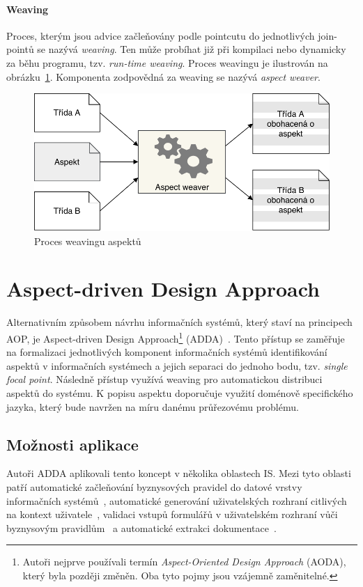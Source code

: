 \paragraph{Weaving}
Proces, kterým jsou advice začleňovány podle pointcutu do
jednotlivých join-pointů se nazývá \textit{weaving}. Ten může
probíhat již při kompilaci nebo dynamicky za běhu programu,
tzv. \textit{run-time weaving}. Proces weavingu je ilustrován
na obrázku~\ref{fig:aspect-weaving}. Komponenta zodpovědná za
weaving se nazývá \textit{aspect weaver}.

\begin{figure}[t]
    \centering
    \includegraphics[keepaspectratio=true, width=0.7\linewidth]{figures/aspect-weaving.pdf}
    \caption{Proces weavingu aspektů}
    \label{fig:aspect-weaving}
\end{figure}

\section{Aspect-driven Design Approach}

Alternativním způsobem návrhu informačních systémů, který staví na principech \gls{AOP},
je Aspect-driven Design Approach\footnote{Autoři nejprve používali termín \textit{Aspect-Oriented
Design Approach} (AODA), který byla později změněn. Oba tyto pojmy jsou vzájemně zaměnitelné.}
(\gls{ADDA})~\cite{cemus2014aspect}. Tento přístup se zaměřuje na formalizaci
jednotlivých komponent informačních systémů identifikování aspektů
v informačních systémech a jejich separaci do jednoho bodu, tzv. \textit{single focal point}.
Následně přístup využívá weaving pro automatickou distribuci aspektů do systému.
K popisu aspektu doporučuje využití doménově specifického jazyka, který bude navržen na
míru danému průřezovému problému.

\subsection{Možnosti aplikace}

Autoři \gls{ADDA} aplikovali tento koncept v několika oblastech \gls{IS}.
Mezi tyto oblasti patří automatické začleňování byznysových pravidel
do datové vrstvy informačních systémů~\cite{cemus2015automated}, automatické
generování uživatelských rozhraní citlivých na kontext uživatele~\cite{cemus2017separation},
validaci vstupů formulářů v uživatelském rozhraní vůči byznysovým pravidlům~\cite{cemus2016context}\cite{cemus2017separation}
a automatické extrakci dokumentace~\cite{cemus2017automated}.

